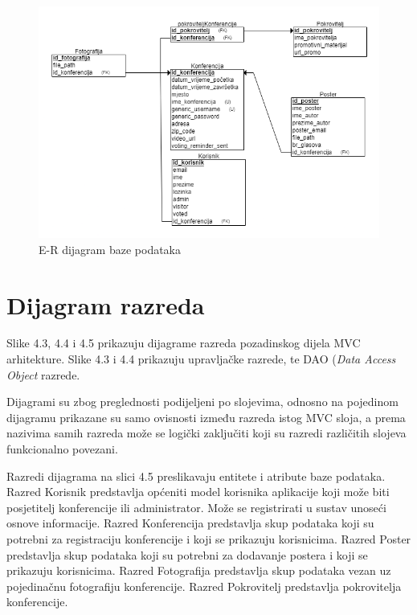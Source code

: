 					\begin{figure} [h]
						\includegraphics[width=\linewidth]{Slike/ERDijagramFinal}
						\caption{E-R dijagram baze podataka}
					\end{figure}
			
			\eject
			
			
		\section{Dijagram razreda}
			
			\indent Slike 4.3, 4.4 i 4.5 prikazuju dijagrame razreda pozadinskog dijela MVC arhitekture. Slike 4.3 i 4.4 prikazuju upravljačke razrede, te DAO (\textit{Data Access Object} razrede. 
			
			Dijagrami su zbog preglednosti podijeljeni po slojevima, odnosno na pojedinom dijagramu prikazane su samo ovisnosti između razreda istog MVC sloja, a prema nazivima samih razreda može se logički zaključiti koji su razredi različitih slojeva funkcionalno povezani.
			
			Razredi dijagrama na slici 4.5 preslikavaju entitete i atribute baze podataka. Razred Korisnik predstavlja općeniti model korisnika aplikacije koji može biti posjetitelj konferencije ili administrator. Može se registrirati u sustav unoseći osnove informacije. Razred Konferencija predstavlja skup podataka koji su potrebni za registraciju konferencije i koji se prikazuju korisnicima. Razred Poster predstavlja skup podataka koji su potrebni za dodavanje postera i koji se prikazuju korisnicima. Razred Fotografija predstavlja skup podataka vezan uz pojedinačnu fotografiju konferencije. Razred Pokrovitelj predstavlja pokrovitelja konferencije.
			
